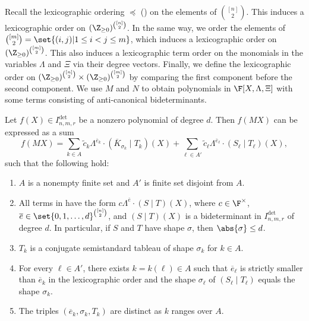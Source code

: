 \documentclass[letterpaper, 11pt]{amsart}
\begin{document}
Recall the lexicographic ordering $\preceq$ () on the elements of $\binom{[n]}{2}$.
This induces a lexicographic order on $(\Z_{\geq 0})^{\binom{[n]}{2}}$.
In the same way, we order the elements of $\binom{[m]}{2} = \set{(i, j) | 1 \leq i < j \leq m}$, which induces a lexicographic order on $(\Z_{\geq 0})^{\binom{[m]}{2}}$.
This also induces a lexicographic term order on the monomials in the variables $\Lambda$ and $\Xi$ via their degree vectors.
Finally, we define the lexicographic order on $(\Z_{\geq 0})^{\binom{[n]}{2}} \times (\Z_{\geq 0})^{\binom{[m]}{2}}$ by comparing the first component before the second component.
We use $M$ and $N$ to obtain polynomials in $\F[X, \Lambda, \Xi]$ with some terms consisting of anti-canonical bideterminants.

\begin{lem}\label{lem:bideterminant_leading_terms}
Let $f(X) \in I^{\det}_{n, m, r}$ be a nonzero polynomial of degree $d$.
Then $f(MX)$ can be expressed as a sum
\begin{equation}\label{eq:expansion1}
    f(MX) = \sum_{k \in A} \widetilde{c}_{k} \Lambda^{\overline{e}_k}\cdot (\overline{K}_{\sigma_k}\mid T_k)(X) + \sum_{\ell\in A'} \widetilde{c}_{\ell} \Lambda^{\overline{e}_\ell}\cdot (S_\ell\mid T_\ell)(X),
\end{equation}
such that the following hold:
\begin{enumerate}
    \item\label{item:expansion1_i0} $A$ is a nonempty finite set and $A'$ is finite set disjoint from $A$.
    \item\label{item:expansion1_i1} All terms in  have the form $c \Lambda^{\overline{e}}\cdot (S\mid T)(X)$, where $c\in \F^\times$, $\overline{e}\in \set{0,1,\dots,d}^{\binom{[n]}{2}}$,
    and $(S\mid T)(X)$ is a bideterminant in $I^{\det}_{n, m, r}$ of degree $d$.
    In particular, if $S$ and $T$ have shape $\sigma$, then $\abs{\sigma} \leq d$.
    \item $T_k$ is a conjugate semistandard tableau of shape $\sigma_k$ for $k\in A$.
    \item\label{item:expansion1_i1.5} For every $\ell\in A'$, there exists $k=k(\ell)\in A$ such that $\overline{e}_\ell$ is strictly smaller than $\overline{e}_k$ in the lexicographic order and the shape $\sigma_\ell$ of $(S_\ell\mid T_\ell)$ equals the shape $\sigma_k$.
    \item\label{item:expansion1_i2} The triples $(\overline{e}_k,\sigma_k,T_k)$ are distinct as $k$ ranges over $A$.
\end{enumerate} 
\end{lem}
\end{document}
